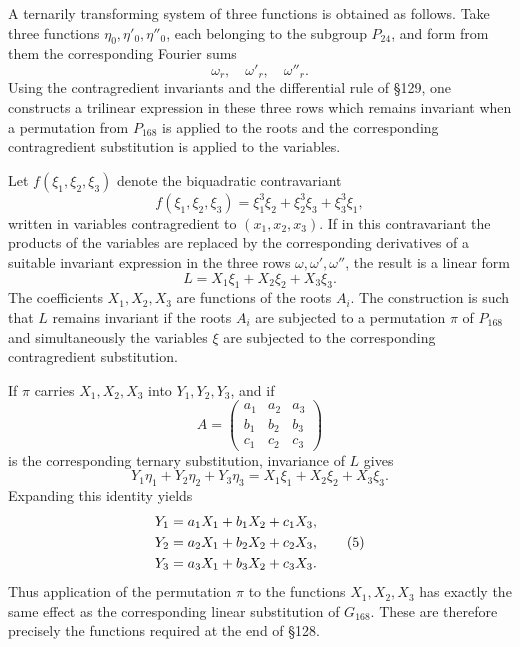 \documentclass[12pt,a4paper]{article}
\begin{document}
A ternarily transforming system of three functions is obtained as follows.  Take three functions \(\eta_0,\eta'_0,\eta''_0\), each belonging to the subgroup \(P_{24}\), and form from them the corresponding Fourier sums
\[
 \omega_r,
\quad \omega'_r,
\quad \omega''_r.
\]
Using the contragredient invariants and the differential rule of \S 129, one constructs a trilinear expression in these three rows which remains invariant when a permutation from \(P_{168}\) is applied to the roots and the corresponding contragredient substitution is applied to the variables.

Let \(f(\xi_1,\xi_2,\xi_3)\) denote the biquadratic contravariant
\begin{equation}
 f(\xi_1,\xi_2,\xi_3)=\xi_1^3\xi_2+\xi_2^3\xi_3+\xi_3^3\xi_1, \tag{2}
\end{equation}
written in variables contragredient to \((x_1,x_2,x_3)\).  If in this contravariant the products of the variables are replaced by the corresponding derivatives of a suitable invariant expression in the three rows \(\omega,\omega',\omega''\), the result is a linear form
\begin{equation}
 L=X_1\xi_1+X_2\xi_2+X_3\xi_3. \tag{3}
\end{equation}
The coefficients \(X_1,X_2,X_3\) are functions of the roots \(A_i\).  The construction is such that \(L\) remains invariant if the roots \(A_i\) are subjected to a permutation \(\pi\) of \(P_{168}\) and simultaneously the variables \(\xi\) are subjected to the corresponding contragredient substitution.

If \(\pi\) carries \(X_1,X_2,X_3\) into \(Y_1,Y_2,Y_3\), and if
\[
 A=\begin{pmatrix}
 a_1&a_2&a_3\\ b_1&b_2&b_3\\ c_1&c_2&c_3
 \end{pmatrix}
\]
is the corresponding ternary substitution, invariance of \(L\) gives
\begin{equation}
 Y_1\eta_1+Y_2\eta_2+Y_3\eta_3=X_1\xi_1+X_2\xi_2+X_3\xi_3. \tag{4}
\end{equation}
Expanding this identity yields
\begin{align}
 Y_1&=a_1X_1+b_1X_2+c_1X_3,\notag\\
 Y_2&=a_2X_1+b_2X_2+c_2X_3,\tag{5}\\
 Y_3&=a_3X_1+b_3X_2+c_3X_3.\notag
\end{align}
Thus application of the permutation \(\pi\) to the functions \(X_1,X_2,X_3\) has exactly the same effect as the corresponding linear substitution of \(G_{168}\).  These are therefore precisely the functions required at the end of \S 128.
\end{document}
